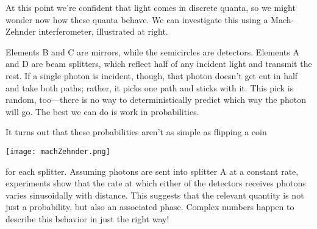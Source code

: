 \documentclass[../p051main.tex]{subfiles}
\begin{document}
\parbox{0.65\textwidth}{
    At this point we're confident that light comes in discrete quanta, so we might wonder now how these quanta behave.
    We can investigate this using a Mach-Zehnder interferometer, illustrated at right.
    
    \vspace{6pt}
    Elements B and C are mirrors, while the semicircles are detectors.
    Elements A and D are beam splitters, which reflect half of any incident light and transmit the rest.
    If a single photon is incident, though, that photon doesn't get cut in half and take both paths; rather, it picks one path and sticks with it.
    This pick is random, too---there is no way to deterministically predict which way the photon will go.
    The best we can do is work in probabilities.

    \vspace{6pt}
    It \hfill turns \hfill out \hfill that \hfill these \hfill probabilities \hfill aren't \hfill as \hfill simple \hfill as \hfill flipping \hfill a \hfill coin
}\parbox{0.35\textwidth}{
    \quad\;
    \texttt{[image: machZehnder.png]}
}

\vspace{-4pt}
for each splitter.
Assuming photons are sent into splitter A at a constant rate, experiments show that the rate at which either of the detectors receives photons varies sinusoidally with distance.
This suggests that the relevant quantity is not just a probability, but also an associated phase.
Complex numbers happen to describe this behavior in just the right way!
\end{document}
